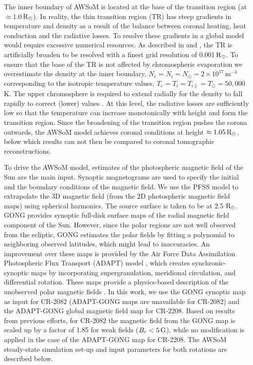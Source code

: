 \documentclass[namedreferences]{solarphysics}
\newcommand{\mrsun}{{\rm R_\odot}}
\begin{document}
\begin{article}
The inner boundary of AWSoM is located at the base of the transition region (at $\approx$1.0\,$\mrsun$). In reality, the thin {transition region (TR)} has steep gradients in temperature and density as a result of the balance between coronal heating, heat conduction and the radiative losses. To resolve these gradients in a global model would require excessive numerical resources. As described in \citet{Lio2009} and \citet{Sok2013}{, the TR is artificially broaden to be resolved with a} finest grid resolution of 0.001\,$\mrsun$.  To ensure that the base of the TR is not affected by chromospheric evaporation we overestimate the density at the inner boundary, $N_{e}=N_{i}=N_{\odot} =2\times10^{17}$\,m$^{-3}$ corresponding to the isotropic temperature values, $T_{e}=T_{i}=T_{i\parallel}=T_{\odot}=50,000$\,K. The upper chromosphere is required to extend radially for the density to fall rapidly to correct (lower) values \citep{Lio2009}.  At this level, the radiative losses are sufficiently low so that the temperature can increase monotonically with height and form the transition region. Since the broadening of the transition region pushes the corona outwards, {the AWSoM model achieves coronal conditions at height $\approx 1.05\,\mrsun$, below which results can not then be compared to coronal tomographic reconstructions.}

To drive {the AWSoM model, estimates} of the photospheric magnetic field of the Sun {are the main} input. Synoptic magnetograms are used to specify the initial and the boundary conditions of the {magnetic field.} We use the PFSS model to extrapolate the 3D magnetic field (from the 2D photospheric magnetic field maps) using spherical harmonics. The source surface is taken to be at 2.5 $\mrsun$. GONG provides synoptic full-disk surface maps of the radial magnetic field component of the Sun. However, since the polar regions are not well observed from the ecliptic, GONG estimates the polar fields by fitting a polynomial to neighboring observed latitudes, which might lead to inaccuracies. An improvement over these maps is provided by the Air Force Data Assimilation Photospheric Flux Transport (ADAPT) model \citep{Wor2000}, which creates synchronic-synoptic maps by incorporating supergranulation, meridional circulation, and differential rotation. These maps provide a physics-based description of the unobserved polar magnetic fields \citep{Arg2010, Hen2012}. In this work, we use the GONG synoptic map as input for CR-2082 (ADAPT-GONG maps are unavailable for CR-2082) and the ADAPT-GONG global magnetic field map for CR-2208. {Based on results from previous efforts, for CR-2082} the magnetic field from the GONG map is scaled up by a factor of 1.85 {for weak fields ($B_r< 5\,\rm{G}$), while no modification is applied in the case of} the ADAPT-GONG map for CR-2208. The AWSoM steady-state simulation set-up and input parameters for both rotations are described below. 


\end{article}
\end{document}
